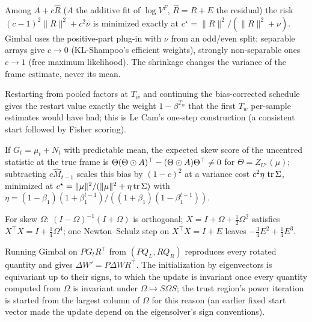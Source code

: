 \begin{proposition}
\label{prop:shrink}
Among $A+c\hat R$ ($A$ the additive fit of $\log V^F$, $\hat R=R+E$ the residual) the risk
$(c-1)^2\|R\|^2+c^2\nu$ is minimized exactly at $c^\star=\|R\|^2/(\|R\|^2+\nu)$. Gimbal uses the
positive-part plug-in with $\nu$ from an odd/even split; separable arrays give $c\to0$ (KL-Shampoo's
efficient weights), strongly non-separable ones $c\to1$ (free maximum likelihood). The shrinkage
changes the variance of the frame estimate, never its mean.
\end{proposition}

\begin{remark}\label{rem:warm}
Restarting from pooled factors at $T_w$ and continuing the bias-corrected schedule gives the restart
value exactly the weight $1-\beta^{T_w}$ that the first $T_w$ per-sample estimates would have had;
this is Le Cam's one-step construction (a consistent start followed by Fisher scoring).
\end{remark}

\begin{proposition}\label{prop:center}
If $G_t=\mu_t+N_t$ with predictable mean, the expected skew score of the uncentred statistic at
the true frame is $\Theta(\Theta\odot A)^\top-(\Theta\odot A)\Theta^\top\ne0$ for $\Theta=Z_{U^\star}(\mu)$;
subtracting $c\hat M_{t-1}$ scales this bias by $(1-c)^2$ at a variance cost $c^2\eta\,\operatorname{tr}\Sigma$,
minimized at $c^\star=\|\mu\|^2/(\|\mu\|^2+\eta\operatorname{tr}\Sigma)$ with
$\eta=(1-\beta_1)(1+\beta_1^{t-1})/((1+\beta_1)(1-\beta_1^{t-1}))$.
\end{proposition}

\begin{theorem}\label{thm:retraction}
For skew $\Omega$: $(I-\Omega)^{-1}(I+\Omega)$ is orthogonal; $X=I+\Omega+\frac12\Omega^2$ satisfies
$X^\top X=I+\frac14\Omega^4$; one Newton--Schulz step on $X^\top X=I+E$ leaves
$-\frac34E^2+\frac14E^3$.
\end{theorem}

\begin{theorem}\label{thm:equivariance}
Running Gimbal on $PG_tR^\top$ from $(PQ_L,RQ_R)$ reproduces every rotated quantity and gives
$\Delta W'=P\Delta WR^\top$. The initialization by eigenvectors is equivariant up to their signs,
to which the update is invariant once every quantity computed from $\Omega$ is invariant under
$\Omega\mapsto S\Omega S$; the trust region's power iteration is started from the largest column of
$\Omega$ for this reason (an earlier fixed start vector made the update depend on the
eigensolver's sign conventions).
\end{theorem}

